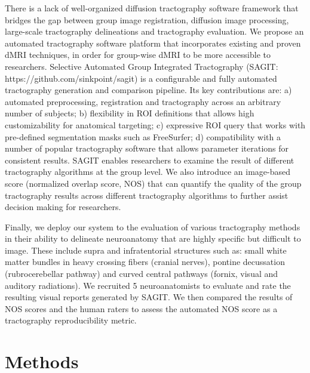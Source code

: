 There is a lack of well-organized diffusion tractography software framework that bridges the gap between group image registration, diffusion image processing, large-scale tractography delineations and tractography evaluation. We propose an automated tractography software platform that incorporates existing and proven dMRI techniques, in order for group-wise dMRI to be more accessible to researchers. Selective Automated Group Integrated Tractography (SAGIT: https://github.com/sinkpoint/sagit) is a configurable and fully automated tractography generation and comparison pipeline. Its key contributions are: a) automated preprocessing, registration and tractography across an arbitrary number of subjects; b) flexibility in ROI definitions that allows high customizability for anatomical targeting; c) expressive ROI query that works with pre-defined segmentation masks such as FreeSurfer; d) compatibility with a number of popular tractography software that allows parameter iterations for consistent results.  SAGIT enables researchers to examine the result of different tractography algorithms at the group level.  We also introduce an image-based score (normalized overlap score, NOS) that can quantify the quality of the group tractography results across different tractography algorithms to further assist decision making for researchers.

Finally, we deploy our system to the evaluation of various tractography methods in their ability to delineate neuroanatomy that are highly specific but difficult to image. These include supra and infratentorial structures such as: small white matter bundles in heavy crossing fibers (cranial nerves), pontine decussation (rubrocerebellar pathway) and curved central pathways (fornix, visual and auditory radiations). We recruited 5 neuroanatomists to evaluate and rate the resulting visual reports generated by SAGIT. We then compared the results of NOS scores and the human raters to assess the automated NOS score as a tractography reproducibility metric. 

\section{Methods}


